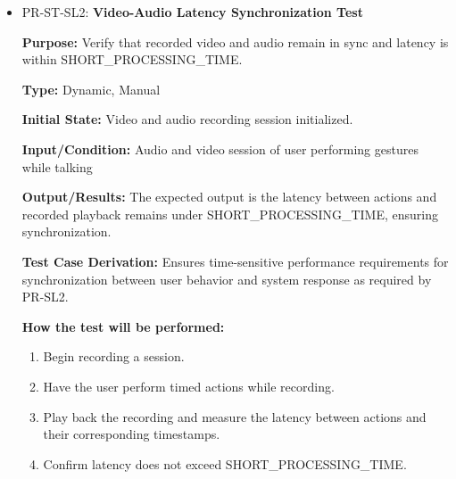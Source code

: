 \documentclass[12pt, titlepage]{article}
\begin{document}
\begin{itemize}
\item PR-ST-SL2: \textbf{Video-Audio Latency Synchronization Test}
  \begin{mdframed}[linewidth=0.5mm]
      \textbf{Purpose:} Verify that recorded video and audio remain in sync and latency is within SHORT\_PROCESSING\_TIME. \par
      \textbf{Type:} Dynamic, Manual \par
      \textbf{Initial State:} Video and audio recording session initialized. \par
      \textbf{Input/Condition:} Audio and video session of user performing gestures while talking \par
      \textbf{Output/Results:} The expected output is the latency between actions and recorded playback remains under SHORT\_PROCESSING\_TIME, ensuring synchronization. \par
      \textbf{Test Case Derivation:} Ensures time-sensitive performance requirements for synchronization between user behavior and system response as required by PR-SL2. \par
      \textbf{How the test will be performed:}
      \begin{enumerate}[noitemsep]
        \item Begin recording a session.
        \item Have the user perform timed actions while recording.
        \item Play back the recording and measure the latency between actions and their corresponding timestamps.
        \item Confirm latency does not exceed SHORT\_PROCESSING\_TIME.
      \end{enumerate}
  \end{mdframed}


\end{itemize}
\end{document}
